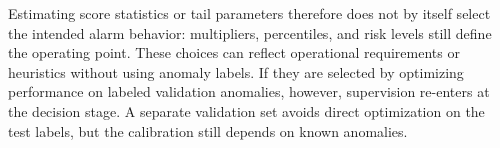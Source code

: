 Estimating score statistics or tail parameters therefore does not by itself select the intended alarm behavior: multipliers, percentiles, and risk levels still define the operating point. These choices can reflect operational requirements or heuristics without using anomaly labels. If they are selected by optimizing performance on labeled validation anomalies, however, supervision re-enters at the decision stage. A separate validation set avoids direct optimization on the test labels, but the calibration still depends on known anomalies.
